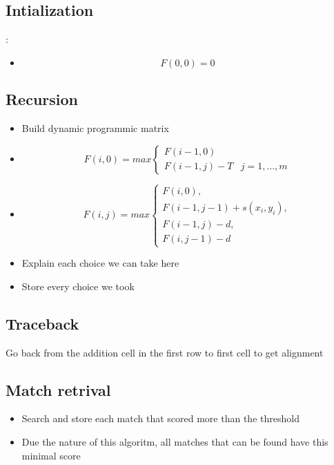 \subsection{Intialization}:
	\begin{itemize}
		\item \[F(0,0) = 0\]
	\end{itemize}

\subsection{Recursion}
	\begin{itemize}
		\item Build dynamic programmic matrix
		\item  \[F(i,0) = max \left\{ \begin{array}{lr}F(i-1,0)&\\F(i-1,j)-T& j=1,\dots,m\end{array}\right. \]
		\item  \[F(i,j) = max \left\{ \begin{array}{lr}F(i,0),\\F(i-1,j-1)+s(x_i,y_i),\\F(i-1,j)-d,\\F(i,j-1)-d\end{array}\right.\]
		\item Explain each choice we can take here
		\item Store every choice we took
	\end{itemize}
\subsection{Traceback}
Go back from the addition cell in the first row to first cell to get alignment

\subsection{Match retrival}
	\begin{itemize}
		\item Search and store  each match that scored more than the threshold
		\item Due the nature of this algoritm, all matches that can be found have this minimal score
	\end{itemize}


